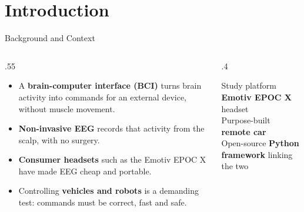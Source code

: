 \documentclass[aspectratio=169,11pt]{beamer}
\begin{document}
\section{Introduction}

\begin{frame}{Background and Context}
  \begin{columns}[T]
    \begin{column}{.55\textwidth}
      \begin{itemize}
        \item A \textbf{brain-computer interface (BCI)} turns brain activity into commands for an external device, without muscle movement.
        \item \textbf{Non-invasive EEG} records that activity from the scalp, with no surgery.
        \item \textbf{Consumer headsets} such as the Emotiv EPOC X have made EEG cheap and portable.
        \item Controlling \textbf{vehicles and robots} is a demanding test: commands must be correct, fast and safe.
      \end{itemize}
    \end{column}
    \begin{column}{.4\textwidth}
      \begin{block}{Study platform}
        \textbf{Emotiv EPOC X} headset\\
        Purpose-built \textbf{remote car}\\
        Open-source \textbf{Python framework} linking the two
      \end{block}
    \end{column}
  \end{columns}
\end{frame}
\end{document}
